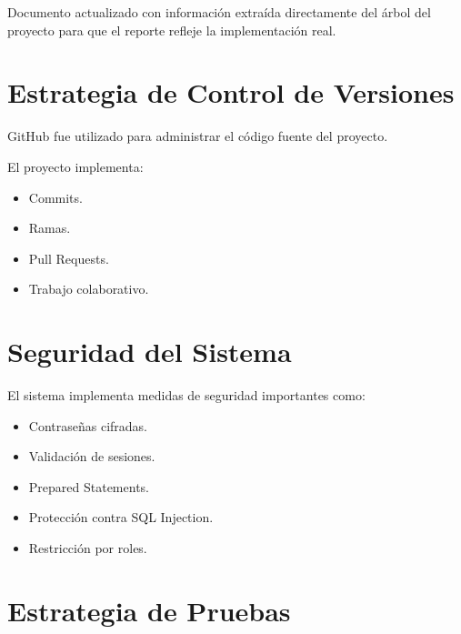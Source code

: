 \documentclass[12pt,letterpaper,oneside]{extreport}
\begin{document}
\noindent Documento actualizado con información extraída directamente del árbol del proyecto para que el reporte refleje la implementación real.

\chapter{Estrategia de Control de Versiones}

GitHub fue utilizado para administrar el código fuente del proyecto.

El proyecto implementa:

\begin{itemize}
    \item Commits.
    
    \item Ramas.
    
    \item Pull Requests.
    
    \item Trabajo colaborativo.
\end{itemize}

\chapter{Seguridad del Sistema}

El sistema implementa medidas de seguridad importantes como:

\begin{itemize}
    \item Contraseñas cifradas.
    
    \item Validación de sesiones.
    
    \item Prepared Statements.
    
    \item Protección contra SQL Injection.
    
    \item Restricción por roles.
\end{itemize}

\chapter{Estrategia de Pruebas}
\end{document}
